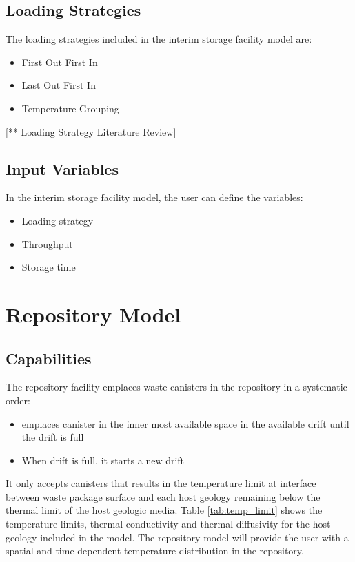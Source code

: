 \subsection{Loading Strategies}
The loading strategies included in the interim storage facility 
model are: 
\begin{itemize}
\item First Out First In 
\item Last Out First In 
\item Temperature Grouping
\end{itemize}

[** Loading Strategy Literature Review]

\subsection{Input Variables}
In the interim storage facility model, the user can define the 
variables: 
\begin{itemize}
	\item Loading strategy 
	\item Throughput 
	\item Storage time 
\end{itemize} 

\section{Repository Model}

\subsection{Capabilities}
The repository facility emplaces waste canisters in the repository 
in a systematic order: 
\begin{itemize}
    \item emplaces canister in the inner most available space 
    in the available drift until the drift is full 
    \item When drift is full, it starts a new drift
\end{itemize}
It only accepts canisters that results in the temperature limit at
interface between waste package surface and each host geology 
remaining below the thermal limit of the host geologic media. 
Table \ref{tab:temp_limit} shows the temperature limits, thermal 
conductivity and thermal diffusivity for the host geology included 
in the model. 
The repository model will provide the user with a spatial and time 
dependent temperature distribution in the repository. 

